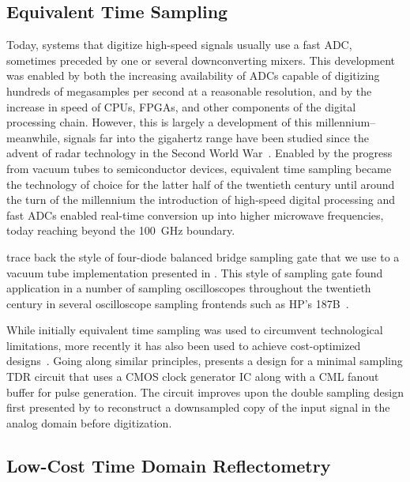 \documentclass[final]{iacrtrans}
\begin{document}
\subsection{Equivalent Time Sampling}

Today, systems that digitize high-speed signals usually use a fast ADC, sometimes preceded by one or several
downconverting mixers. This development was enabled by both the increasing availability of ADCs capable of digitizing
hundreds of megasamples per second at a reasonable resolution, and by the increase in speed of CPUs,
FPGAs, and other components of the digital processing chain. However, this is largely a development of this
millennium--meanwhile, signals far into the gigahertz range have been studied since the advent of radar technology in
the Second World War~\cite{kahrs50YearsRF2003}. Enabled by the progress from vacuum tubes to semiconductor devices,
equivalent time sampling became the technology of choice for the latter half of the twentieth century until around the
turn of the millennium the introduction of high-speed digital processing and fast ADCs enabled real-time conversion up
into higher microwave frequencies, today reaching beyond the \qty{100}{\giga\hertz} boundary.

\textcite{kahrs50YearsRF2003} trace back the style of four-diode balanced bridge sampling gate that we use to a vacuum
tube implementation presented in \textcite{chanceWaveforms1949}. This style of sampling gate found application in a
number of sampling oscilloscopes throughout the twentieth century in several oscilloscope sampling frontends such as
HP's 187B~\cite{HP187BDualTrace1962}. 

While initially equivalent time sampling was used to circumvent technological limitations, more recently it has also
been used to achieve cost-optimized designs~\cite{houtman1GHzSamplingOscilloscope2000}. Going along similar principles,
\textcite{polasekReflektometrCasoveOblasti2020} presents a design for a minimal sampling TDR circuit that uses a CMOS
clock generator IC along with a CML fanout buffer for pulse generation. The circuit improves upon the double sampling
design first presented by \textcite{houtman1GHzSamplingOscilloscope2000} to reconstruct a downsampled copy of the input
signal in the analog domain before digitization.

\subsection{Low-Cost Time Domain Reflectometry}
\end{document}
